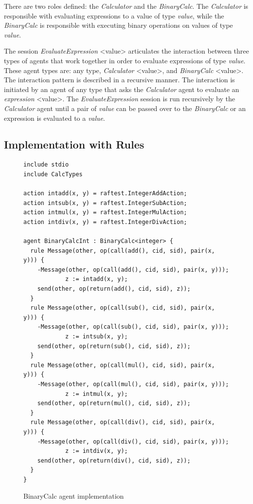 \documentclass[a4paper,12pt,oneside,fleqn]{book} %
\begin{document}
There are two roles defined: the \textit{Calculator} and the
\textit{BinaryCalc}. The \textit{Calculator} is responsible with evaluating
expressions to a value of type \textit{value}, while the
\textit{BinaryCalc} is responsible with executing binary operations on
values of type \textit{value}.

The session \textit{EvaluateExpression} <value> articulates the interaction
between three types of agents that work together in order to evaluate
expressions of type \textit{value}. These agent types are: any type,
\textit{Calculator} <value>, and \textit{BinaryCalc} <value>. The
interaction pattern is described in a recursive manner. The interaction is
initiated by an agent of any type that asks the \textit{Calculator} agent
to evaluate an \textit{expression} <value>. The \textit{EvaluateExpression}
session is run recursively by the \textit{Calculator} agent until a pair of
\textit{value} can be passed over to the \textit{BinaryCalc} or an
expression is evaluated to a \textit{value}.
\subsection{Implementation with Rules} %
\begin{figure}\footnotesize %
\begin{verbatim}
include stdio
include CalcTypes

action intadd(x, y) = raftest.IntegerAddAction;
action intsub(x, y) = raftest.IntegerSubAction;
action intmul(x, y) = raftest.IntegerMulAction;
action intdiv(x, y) = raftest.IntegerDivAction;

agent BinaryCalcInt : BinaryCalc<integer> {
  rule Message(other, op(call(add(), cid, sid), pair(x, y))) {
    -Message(other, op(call(add(), cid, sid), pair(x, y)));
            z := intadd(x, y);
    send(other, op(return(add(), cid, sid), z));
  }
  rule Message(other, op(call(sub(), cid, sid), pair(x, y))) {
    -Message(other, op(call(sub(), cid, sid), pair(x, y)));
            z := intsub(x, y);
    send(other, op(return(sub(), cid, sid), z));
  }
  rule Message(other, op(call(mul(), cid, sid), pair(x, y))) {
    -Message(other, op(call(mul(), cid, sid), pair(x, y)));
            z := intmul(x, y);
    send(other, op(return(mul(), cid, sid), z));
  }
  rule Message(other, op(call(div(), cid, sid), pair(x, y))) {
    -Message(other, op(call(div(), cid, sid), pair(x, y)));
            z := intdiv(x, y);
    send(other, op(return(div(), cid, sid), z));
  }
}
\end{verbatim}
\caption{BinaryCalc agent implementation}
\label{fig:bcalc-rules}
\end{figure} %
\end{document}
